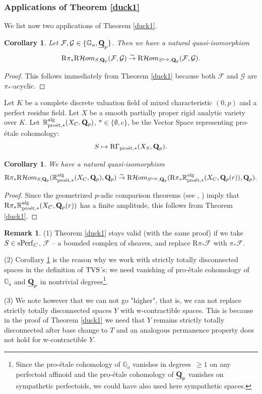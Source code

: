 \documentclass[10pt]{amsart}
\let\cal\mathcal
\newtheorem{corollary}[equation]{Corollary}
\theoremstyle{definition}
\newtheorem{remark}[equation]{Remark}
\theoremstyle{remark}
\newcommand{\proeet}{\operatorname{pro\acute{e}t} }
\newcommand{\Hhom}{{\cal Hom}}
\newcommand{\sff}{{\mathcal{F}}}
\newcommand{\sg}{{\mathcal{G}}}
\numberwithin{equation}{section}
\def\R{{\mathrm R}}
\def\Q{{\bf Q}} \def\Z{{\bf Z}}
\numberwithin{equation}{section}
\begin{document}
\subsubsection{Applications of Theorem \ref{duck1}}
  We list now two applications of Theorem \ref{duck1}. 
\begin{corollary}\label{duck2}
Let $\sff,\sg\in \{{\mathbb G}_a, \underline{\Q}_p\}$.  Then we have a natural quasi-isomorphism
$$
\R\pi_*\R\Hhom_{S,\Q_p}(\sff,\sg)\stackrel{\sim}{\to}\R\Hhom_{S^{\rm top},\Q_p}(\sff,\sg).
$$
\end{corollary}
\begin{proof}
This follows immediately from Theorem \ref{duck1} because both $\sff$ and $\sg$ are $\pi_*$-acyclic. 
\end{proof}
Let $K$ be a complete discrete valuation field of mixed characteristic $(0,p)$ and a perfect residue field. Let $X$ be a smooth partially proper rigid analytic variety over $K$. Let ${\mathbb R}^{\rm alg}_{\proeet,*}(X_C,\Q_p)$, $*\in\{\emptyset, c\}$,  be the  Vector Space representing pro-\'etale cohomology: 
$$
S\mapsto \R\Gamma_{\proeet,*}(X_S,\Q_p). 
$$
\begin{corollary}\label{duck3} We have a natural quasi-isomorphism
$$
\R\pi_*\R\Hhom_{S,\Q_p}({\mathbb R}^{\rm alg}_{\proeet,*}(X_C,\Q_p),\Q_p)\stackrel{\sim}{\to}\R\Hhom_{S^{\rm top},\Q_p}(\R\pi_*{\mathbb R}^{\rm alg}_{\proeet,*}(X_C,\Q_p(r)),\Q_p).
$$
\end{corollary} 
\begin{proof} Since the geometrized $p$-adic comparison theorems (see \cite{CN4}, \cite{AGN})  imply that $\R\pi_*{\mathbb R}^{\rm alg}_{\proeet,*}(X_C,\Q_p(r))$ has a finite amplitude, this follows from Theorem \ref{duck1}.
\end{proof}
 \begin{remark} (1)  Theorem \ref{duck1} stays valid (with the same proof) if we take $S\in {\rm sPerf}_C$, $\sff$ -- a bounded complex of sheaves, and replace $\R\pi_*\sff$ with $\pi_*\sff$. 
 
(2) Corollary \ref{duck2} is the reason why we work with strictly totally disconnected spaces in the definition of ${\rm TVS}$'s: we need vanishing of pro-\'etale cohomology of 
${\mathbb G}_a$ and $\underline{\Q}_p$ in nontrivial degrees\footnote{Since the pro-\'etale cohomology of ${\mathbb G}_a$ vanishes in degrees~$\geq 1$ on any perfectoid affinoid and 
the pro-\'etale cohomology of $\underline{\Q}_p$ vanishes on sympathetic perfectoids, we could have also used here sympathetic spaces.}.

(3) We note however that we can not go "higher", that is, we can not   replace strictly totally disconnected spaces $Y$ with w-contractible spaces. This is because in the proof of Theorem \ref{duck1} we need that $Y$ remains strictly totally disconnected  after base change to $T$ and an analogous  permanence property does  not hold for w-contractible $Y$.
\end{remark}
\end{document}
